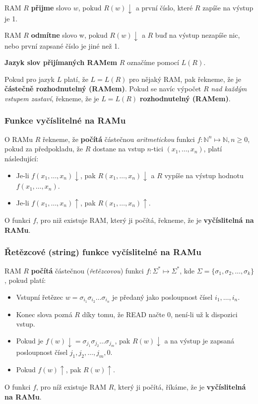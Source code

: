 \documentclass[11pt]{report} %
\newcommand{\N}{\mathbb{N}}
\numberwithin{equation}{section}
\begin{document}
RAM $R$ \textbf{přijme} slovo $w$, pokud $R(w){\downarrow}$ a první číslo, které $R$ zapíše na výstup je 1.

RAM $R$ \textbf{odmítne} slovo w, pokud $R(w){\downarrow}$ a $R$ buď na výstup nezapíše nic, nebo první zapsané číslo je jiné než 1.

\textbf{Jazyk slov přijímaných RAMem} $R$ označíme pomocí $L(R)$. 

Pokud pro jazyk $L$ platí, že $L = L(R)$ pro nějaký RAM, pak řekneme, že je \textbf{částečně rozhodnutelný (RAMem)}. Pokud se navíc výpočet $R$ \textit{nad každým vstupem zastaví}, řekneme, že je $L = L(R)$ \textbf{rozhodnutelný (RAMem)}.

\subsubsection{Funkce vyčíslitelné na RAMu}
O RAMu $R$ řekneme, že \textbf{počítá} částečnou \textit{aritmetickou} funkci $f : \N^n \mapsto \N, n \geq 0$, pokud za předpokladu, že $R$ dostane na vstup $n$-tici $(x_1, \dots, x_n)$, platí následující:
\begin{itemize}
	
	
	\item Je-li $f(x_1, \dots, x_n){\downarrow}$, pak $R(x_1, \dots, x_n){\downarrow}$ a $R$ vypíše na výstup hodnotu $f(x_1, \dots, x_n)$.
	\item Je-li $f(x_1, \dots, x_n){\uparrow}$, pak $R(x_1, \dots, x_n){\uparrow}$.
\end{itemize}
O funkci $f$, pro niž existuje RAM, který ji počítá, řekneme, že je \textbf{vyčíslitelná na RAMu}.

\subsubsection{Řetězcové (string) funkce vyčíslitelné na RAMu}
RAM $R$ \textbf{počítá} částečnou (\textit{řetězcovou}) funkci $f : \Sigma^* \mapsto \Sigma^*$, kde $\Sigma = \{\sigma_1, \sigma_2, \dots, \sigma_k\}$, pokud platí:
\begin{itemize}
	
	
	\item Vstupní řetězec $w = \sigma_{i_1}\sigma_{i_2}\dots\sigma_{i_n}$ je předaný jako posloupnost čísel $i_1, \dots, i_n$.
	\item Konec slova pozná $R$ díky tomu, že READ načte 0, není-li už k dispozici vstup.
	\item Pokud je $f(w){\downarrow}= \sigma_{j_1}\sigma_{j_2}\dots\sigma_{j_m}$, pak $R(w){\downarrow}$ a na výstup je
	zapsaná posloupnost čísel $j_1, j_2, \dots, j_m, 0$.
	\item Pokud $f(w){\uparrow}$, pak $R(w){\uparrow}$.
\end{itemize}
O funkci $f$, pro níž existuje RAM $R$, který ji počítá, říkáme, že je \textbf{vyčíslitelná na RAMu}.
\end{document}
